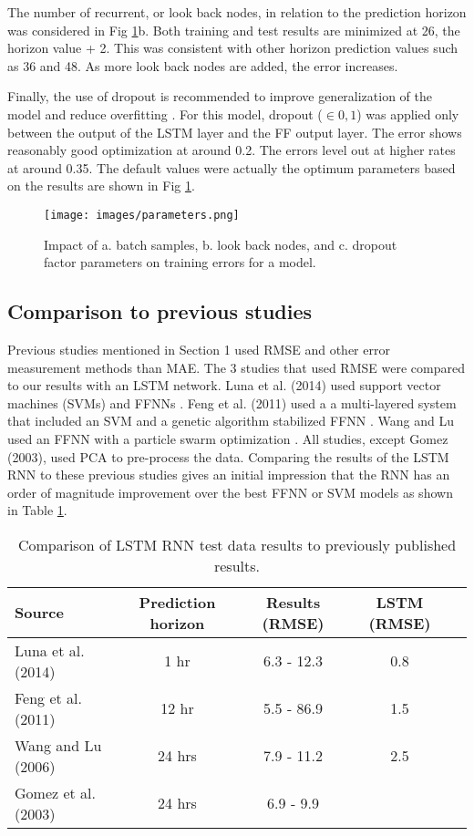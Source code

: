 \documentclass[preprint,12pt,a4paper,authoryear]{elsarticle}
\begin{document}
\begin{linenumbers}
The number of recurrent, or look back nodes, in relation to the prediction horizon was considered in  Fig \ref{fig:parameters}b. Both training and test results are minimized at 26, the horizon value + 2. This was consistent with other horizon prediction values such as 36 and 48. As more look back nodes are added, the error increases.

Finally, the use of dropout is recommended to improve generalization of the model and reduce overfitting \citep{Gal2016}. For this model, dropout ($\in 0,1$) was applied only between the output of the LSTM layer and the FF output layer. The error shows reasonably good optimization at around 0.2. The errors level out at higher rates at around 0.35. The default values were actually the optimum parameters based on the results are shown in Fig \ref{fig:parameters}.
%
\begin{figure}[H]
\centering
\texttt{[image: images/parameters.png]}  %
\caption{Impact of a. batch samples, b. look back nodes, and c. dropout factor parameters on training errors for a model.}
\label{fig:parameters}
\end{figure}
%

\subsection{Comparison to previous studies}
Previous studies mentioned in Section 1 used RMSE and other error measurement methods than MAE. The 3 studies that used RMSE were compared to our results with an LSTM network. Luna et al. (2014) used support vector machines (SVMs) and FFNNs \citep{Luna2014}. Feng et al. (2011) used a a multi-layered system that included an SVM and a genetic algorithm stabilized FFNN \citep{Feng2011}. Wang and Lu used an FFNN with a particle swarm optimization \citep{Wang2006}. All studies, except Gomez (2003), used PCA to pre-process the data. Comparing the results of the LSTM RNN to these previous studies gives an initial impression  that the RNN has an order of magnitude improvement over the best FFNN or SVM models as shown in Table \ref{tb:compare}.
%
\end{linenumbers}
\begin{table}[]
\centering
\caption{Comparison of LSTM RNN test data results to previously published results.}
\label{tb:compare}
\begin{tabular}{@{}lcccc@{}}
\toprule
\textbf{Source} &  \textbf{Prediction horizon} & \textbf{Results (RMSE)} & \textbf{LSTM (RMSE)} \\ \midrule
Luna et al. (2014) & 1 hr & 6.3 - 12.3 & 0.8 \\
Feng et al. (2011) &  12 hr & 5.5 - 86.9 & 1.5 \\
Wang and Lu (2006) & 24 hrs & 7.9 - 11.2 & 2.5 \\ 
Gomez et al. (2003)& 24 hrs & 6.9 - 9.9 & \\ \bottomrule
\end{tabular}
\end{table}
\end{document}
